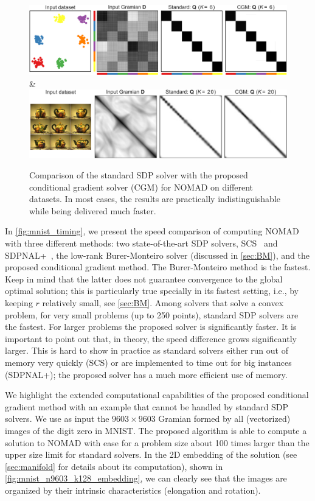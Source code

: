 \documentclass[twoside,11pt]{article}
\begin{document}
\begin{figure}
\begin{tabu}
        \addlinespace[1em]

    	\includegraphics[width=\linewidth]{cvx_vs_cgm/gaussian_blobs_cvx_vs_cgm} &
    	\includegraphics[width=\linewidth]{cvx_vs_cgm/teapot_cvx_vs_cgm} \\
	\end{tabu}
    
	\caption{Comparison of the standard SDP solver with the proposed conditional gradient solver (CGM) for NOMAD on different datasets. In most cases, the results are practically indistinguishable while being delivered much faster.}
	\label{fig:cvx_vs_cgm}
\end{figure}

In \cref{fig:mnist_timing}, we present the speed comparison of computing NOMAD with three different methods: two state-of-the-art SDP solvers, SCS~\citep{SCSsolver} and SDPNAL+~\citep{sdpnalplus}, the low-rank Burer-Monteiro solver (discussed in \cref{sec:BM}), and the proposed conditional gradient method.
The Burer-Monteiro method is the fastest. Keep in mind that the latter does not guarantee convergence to the global optimal solution; this is particularly true specially in its fastest setting, i.e., by keeping $r$ relatively small, see \cref{sec:BM}.
Among solvers that solve a convex problem, for very small problems (up to 250 points), standard SDP solvers are the fastest. For larger problems the proposed solver is significantly faster. It is important to point out that, in theory, the speed difference grows significantly larger. This is hard to show in practice as standard solvers either run out of memory very quickly (SCS) or are implemented to time out for big instances (SDPNAL+); the proposed solver has a much more efficient use of memory.

We highlight the extended computational capabilities of the proposed conditional gradient method with an example that cannot be handled by standard SDP solvers. We use as input the $9603 \times 9603$ Gramian formed by all (vectorized) images of the digit zero in MNIST. The proposed algorithm is able to compute a solution to NOMAD with ease for a problem size about 100 times larger than the upper size limit for standard solvers. In the 2D embedding of the solution (see \cref{sec:manifold} for details about its computation), shown in \cref{fig:mnist_n9603_k128_embedding}, we can clearly see that the images are organized by their intrinsic characteristics (elongation and rotation).
\end{document}
